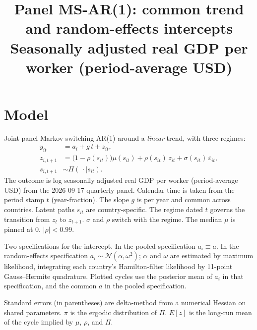\documentclass[11pt]{article}
\title{Panel MS-AR(1): common trend and random-effects intercepts\\[0.4em]
\large Seasonally adjusted real GDP per worker (period-average USD)}
\author{}
\date{}
\begin{document}
\maketitle
\section{Model}
Joint panel Markov-switching AR(1) around a \emph{linear} trend, with three regimes:
\begin{align}
y_{it} &= a_i + g\, t + z_{it}, \\
z_{i,t+1} &= \bigl(1-\rho(s_{it})\bigr)\mu(s_{it}) + \rho(s_{it})\, z_{it} + \sigma(s_{it})\,\varepsilon_{it}, \\
s_{i,t+1} &\sim \Pi(\,\cdot\mid s_{it}).
\end{align}
The outcome is log seasonally adjusted real GDP per worker (period-average USD)
from the 2026-09-17 quarterly panel. Calendar time is taken from the period stamp
$t$ (year-fraction). The slope $g$ is per year and common across countries.
Latent paths $s_{it}$ are country-specific. The regime dated $t$ governs the
transition from $z_t$ to $z_{t+1}$. $\sigma$ and $\rho$ switch with the regime.
The median $\mu$ is pinned at 0. $|\rho|<0.99$.

Two specifications for the intercept. In the pooled specification $a_i\equiv a$.
In the random-effects specification $a_i\sim\mathcal{N}(\alpha,\omega^2)$;
$\alpha$ and $\omega$ are estimated by maximum likelihood, integrating each
country's Hamilton-filter likelihood by 11-point Gauss--Hermite quadrature.
Plotted cycles use the posterior mean of $a_i$ in that specification, and the
common $a$ in the pooled specification.

Standard errors (in parentheses) are delta-method from a numerical Hessian on
shared parameters. $\pi$ is the ergodic distribution of $\Pi$. $E[z]$ is the
long-run mean of the cycle implied by $\mu$, $\rho$, and $\Pi$.

\clearpage
\end{document}
